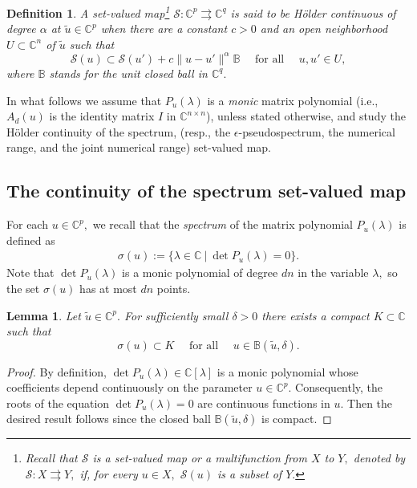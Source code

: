 \documentclass[10pt,reqno]{amsart}
\theoremstyle{break-italic}
\theoremstyle{break-italic}
\theoremstyle{break-italic}
\theoremstyle{break-italic}
\theoremstyle{break-italic}
\theoremstyle{break-italic}
\theoremstyle{break-italic}
\theoremstyle{break-italic}
\newtheorem{lemma}[satz]{Lemma}
\theoremstyle{break-roman}
\newtheorem{definition}[satz]{Definition}
\theoremstyle{standard}
\theoremstyle{varthm-roman}
\theoremstyle{varthm-italic}
\theoremstyle{varthm-roman-break}
\theoremstyle{varthm-italic-break}
\theoremstyle{varthm-roman-no-punctuation}
\theoremstyle{varthm-italic-no-punctuation}
\numberwithin{equation}{section}
\begin{document}
\begin{definition}{\rm
A set-valued map\footnote{Recall that ${\mathcal S}$ is a {\em set-valued map} or a {\em multifunction} from $X$ to $Y,$ denoted by ${\mathcal S} \colon X  \rightrightarrows Y,$ if, for every $u \in X,$ ${\mathcal S}(u)$ is a subset of $Y.$} ${\mathcal S} \colon \mathbb{C}^{p} \rightrightarrows \mathbb{C}^{q}$ is said to be {\em H\"older continuous of degree $\alpha$} at $\tilde{u} \in \mathbb{C}^p$ when there are a constant $c > 0$ and an open  neighborhood $U \subset \mathbb{C}^n$ of $\tilde{u}$ such that
$$\mathcal{S}(u) \subset \mathcal{S}(u') + c \|u - u'\|^{\alpha} \mathbb{B} \quad \textrm{ for all } \quad u, u' \in U,$$
where $\mathbb{B}$ stands for the unit closed ball in $\mathbb{C}^{q}.$
}\end{definition}

In what follows we assume that $P_u(\lambda)$ is a {\em monic} matrix polynomial (i.e., $A_d(u)$ is the identity matrix $I$ in $\mathbb C^{n\times n}$), unless stated otherwise, and study the H\"older continuity of the spectrum,  (resp., the $\epsilon$-pseudospectrum, the numerical range, and the joint numerical range) set-valued map.

\subsection{The continuity of the spectrum set-valued map}


For each $u \in \mathbb{C}^p,$  we recall that the {\em spectrum} of  the matrix polynomial $P_{u}(\lambda)$ is defined as
\begin{eqnarray*}
\sigma(u) := \{ \lambda \in \mathbb{C} \ | \ \det P_{u}(\lambda) = 0\}.
\end{eqnarray*}
 Note that $\det P_{u}(\lambda)$ is a monic polynomial of degree $dn$ in the variable $\lambda,$   so
the set $\sigma(u)$ has at most $dn$ points.

\begin{lemma}\label{Lemma33}
Let $\tilde{u} \in \mathbb{C}^p.$ For sufficiently small $\delta > 0$ there exists a compact $K \subset \mathbb{C}$ such that
$$\sigma(u) \subset K \quad \textrm{ for all } \quad u \in \mathbb{B}(\tilde{u}, \delta).$$
\end{lemma}
\begin{proof}
By definition, $\det P_u(\lambda) \in \mathbb{C}[\lambda]$ is a monic polynomial whose coefficients depend continuously on the parameter $u \in \mathbb{C}^p.$ Consequently, the roots of
the equation $\det P_u(\lambda) = 0$ are continuous functions in $u.$ Then the desired result follows since the closed ball $\mathbb{B}(\tilde{u}, \delta)$ is compact.
\end{proof}
\end{document}
